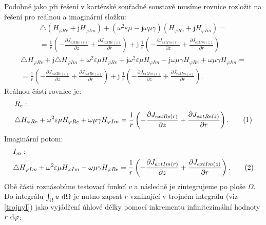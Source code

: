 \documentclass[12pt,a4paper,oneside]{article}
\numberwithin{equation}{section} %
\numberwithin{figure}{section} %
\numberwithin{table}{section} %
\newcommand{\mj}{\mathrm{j}} %
\newcommand\numberthis{\addtocounter{equation}{1}\tag{\theequation}}
\begin{document}
Podobně jako při řešení v kartézské souřadné soustavě musíme rovnice rozložit na řešení pro reálnou a imaginární složku:
\begin{equation}
\begin{split}
\triangle (H _{\varphi Re} + \mj H _{\varphi Im}) + (\omega ^2 \varepsilon \mu - \mj \omega \mu \gamma) (H _{\varphi Re} + \mj H _{\varphi Im}) =\\ 
= \frac{1}{r} \left( - \frac{\partial J _{extRe(r)}}{\partial z} + \frac{\partial J _{extRe(z)}}{\partial r} \right) + \mj ~ \frac{1}{r} \left( - \frac{\partial J _{extIm(r)}}{\partial z} + \frac{\partial J _{extIm(z)}}{\partial r} \right)
\end{split}
\end{equation}
\begin{equation}
\begin{split}
\triangle H _{\varphi Re} + \mj \triangle H _{\varphi Im} + \omega ^2 \varepsilon \mu H_ {\varphi Re} + \mj \omega ^2 \varepsilon \mu H _{\varphi Im} - \mj \omega \mu \gamma H _{\varphi Re} + \omega \mu \gamma H _{\varphi Im} =\\
= \frac{1}{r} \left( - \frac{\partial J _{extRe(r)}}{\partial z} + \frac{\partial J _{extRe(z)}}{\partial r} \right) + \mj ~ \frac{1}{r} \left( - \frac{\partial J _{extIm(r)}}{\partial z} + \frac{\partial J _{extIm(z)}}{\partial r} \right) .
\end{split}
\end{equation}
Reálnou částí rovnice je:
\begin{align*}
&R_{e}:
\\
&\triangle H_ {\varphi Re} + \omega ^2 \varepsilon \mu H_ {\varphi Re} + \omega \mu \gamma H _{\varphi Im} = \frac{1}{r} \left( - \frac{\partial J _{extRe(r)}}{\partial z} + \frac{\partial J _{extRe(z)}}{\partial r} \right) .
\numberthis
\end{align*}
Imaginární potom:
\begin{align*}
&I_{m}:
\\
&\triangle H _{\varphi Im} + \omega ^2 \varepsilon \mu H _{\varphi Im} - \omega \mu \gamma H _{\varphi Re} = \frac{1}{r} \left( - \frac{\partial J _{extIm(r)}}{\partial z} + \frac{\partial J _{extIm(z)}}{\partial r} \right) .
\numberthis
\end{align*}
Obě části roznásobíme testovací funkcí $v$ a následně je zintegrujeme po ploše $\Omega$. Do integrálu $\int _{\Omega} u ~ \mathrm{d} \Omega$ je nutno zapsat $r$ vznikající v trojném integrálu (viz \ref{trojnyI}) jako vyjádření úhlové délky pomocí inkrementu infinitezimální hodnoty $r ~ \mathrm{d} \varphi$:
\end{document}
